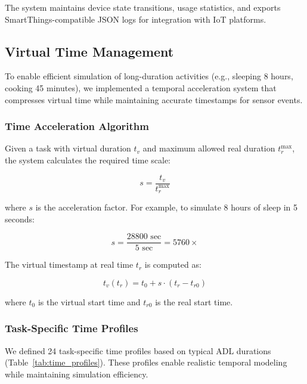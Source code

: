 \documentclass[conference]{IEEEtran}
\begin{document}
The system maintains device state transitions, usage statistics, and exports SmartThings-compatible JSON logs for integration with IoT platforms.

\subsection{Virtual Time Management}

To enable efficient simulation of long-duration activities (e.g., sleeping 8 hours, cooking 45 minutes), we implemented a temporal acceleration system that compresses virtual time while maintaining accurate timestamps for sensor events.

\subsubsection{Time Acceleration Algorithm}

Given a task with virtual duration $t_v$ and maximum allowed real duration $t_r^{\max}$, the system calculates the required time scale:

\begin{equation}
    s = \frac{t_v}{t_r^{\max}}
\end{equation}

where $s$ is the acceleration factor. For example, to simulate 8 hours of sleep in 5 seconds:

\begin{equation}
    s = \frac{28800 \text{ sec}}{5 \text{ sec}} = 5760\times
\end{equation}

The virtual timestamp at real time $t_r$ is computed as:

\begin{equation}
    t_v(t_r) = t_0 + s \cdot (t_r - t_{r0})
\end{equation}

where $t_0$ is the virtual start time and $t_{r0}$ is the real start time.

\subsubsection{Task-Specific Time Profiles}

We defined 24 task-specific time profiles based on typical ADL durations (Table~\ref{tab:time_profiles}). These profiles enable realistic temporal modeling while maintaining simulation efficiency.
\end{document}
